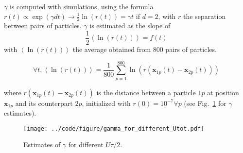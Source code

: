 $\gamma$ is computed with simulations, using the formula $r(t)\propto \exp(\gamma dt)\rightarrow\frac{1}{2}\ln(r(t))=\gamma t$
if $d=2$, with $r$ the separation between pairs of particles. $\gamma$ is estimated as the slope of $$\frac{1}{2}\left\langle \ln(r(t))\right\rangle =f(t)$$ with $\left\langle \ln(r(t))\right\rangle $ the average obtained from 800 pairs of particles. 

$$\forall t,\left\langle \ln(r(t))\right\rangle =\frac{1}{800}\sum_{p=1}^{800}\ln(r(\boldsymbol{x}_{1p}(t)-\boldsymbol{x}_{2p}(t)))$$ 

where $r(\boldsymbol{x}_{1p}(t)-\boldsymbol{x}_{2p}(t))$ is the distance between a particle $1p$ at position $\boldsymbol{x}_{1p}$ and its counterpart $2p$, initialized with $r(0)=10^{-7}\forall p$ (see Fig.~\ref{fig:gamma_Utot} for $\gamma$ estimates).

\begin{figure}[H]
\begin{centering}
\texttt{[image: ../code/figure/gamma\_for\_different\_Utot.pdf]}
\par\end{centering}
\caption{Estimates of $\gamma$ for different $U\tau/2$.\label{fig:gamma_Utot}}
\end{figure}

